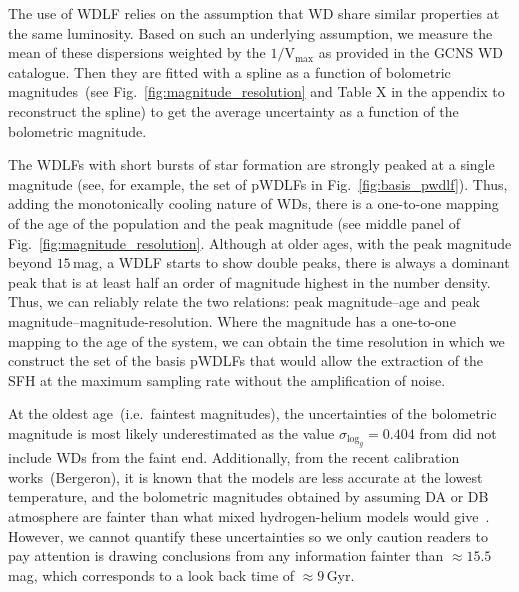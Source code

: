 \documentclass[fleqn,usenatbib]{mnras}
\begin{document}
The use of WDLF relies on the assumption that WD share similar properties
at the same luminosity. Based on such an underlying assumption, we measure
the mean of these dispersions weighted by the $1/\mathrm{V}_{\mathrm{max}}$
as provided in the GCNS WD catalogue. Then they are fitted with a spline as
a function of bolometric magnitudes~(see Fig.~\ref{fig:magnitude_resolution}
and Table X in the appendix to reconstruct the spline) to get the average 
uncertainty as a function of the bolometric magnitude.

The WDLFs with short bursts of star formation are strongly peaked at a single
magnitude (see, for example, the set of pWDLFs in Fig.~\ref{fig:basis_pwdlf}).
Thus, adding the monotonically cooling nature of WDs, there is a one-to-one
mapping of the age of the population and the peak magnitude (see middle panel
of Fig.~\ref{fig:magnitude_resolution}. Although at older ages, with the peak
magnitude beyond $15$\,mag, a WDLF starts to show double peaks, there is always
a dominant peak that is at least half an order of magnitude highest in the
number density. Thus, we can reliably relate the two relations: peak
magnitude--age and peak magnitude--magnitude-resolution. Where the magnitude
has a one-to-one mapping to the age of the system, we can obtain the time
resolution in which we construct the set of the basis pWDLFs that would allow
the extraction of the SFH at the maximum sampling rate without the amplification
of noise.

At the oldest age~(i.e.\ faintest magnitudes), the uncertainties of the
bolometric magnitude is most likely underestimated as the value
$\sigma_{\mathrm{log}_{g}} = 0.404$ from \citet{2014ApJ...796..128G} did not
include WDs from the faint end. Additionally, from the recent calibration
works~(Bergeron), it is known that the models are less accurate at the lowest 
temperature, and the bolometric magnitudes obtained by assuming DA or DB
atmosphere are fainter than what mixed hydrogen-helium models would
give~\citep{2022ApJ...934...36B}. However, we cannot quantify these uncertainties
so we only caution readers to pay attention is drawing conclusions from any
information fainter than $\approx15.5$\,mag, which corresponds to a look back
time of $\approx9$\,Gyr.
\end{document}
